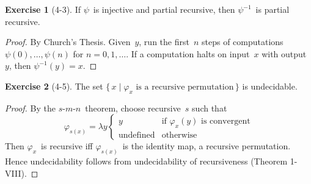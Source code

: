 \documentclass[letterpaper]{article}
\newcommand{\smn}{$s$-$m$-$n$}
\theoremstyle{definition}
\newtheorem*{exer}{Exercise}
\theoremstyle{remark}
\theoremstyle{direction}
\begin{document}
\begin{exer}[4-3]
If $\psi$~is injective and partial recursive, then $\psi^{-1}$~is partial recursive.
\end{exer}
\begin{proof}
By Church's Thesis. Given~$y$, run the first~$n$ steps of computations $\psi(0),\ldots,\psi(n)$ for $n=0,1,\ldots$. If a computation halts on input~$x$ with output~$y$, then $\psi^{-1}(y)=x$.
\end{proof}

\begin{exer}[4-5]
The set $\{\,x\mid\varphi_x\text{ is a recursive permutation}\,\}$ is undecidable.
\end{exer}
\begin{proof}
By the \smn\ theorem, choose recursive~$s$ such that
$$\varphi_{s(x)}=\lambda y\begin{cases}
y&\text{if }\varphi_x(y)\text{ is convergent}\\
\text{undefined}&\text{otherwise}
\end{cases}$$
Then $\varphi_x$~is recursive iff $\varphi_{s(x)}$~is the identity map, a recursive permutation. Hence undecidability follows from undecidability of recursiveness (Theorem 1-VIII).
\end{proof}
\end{document}
